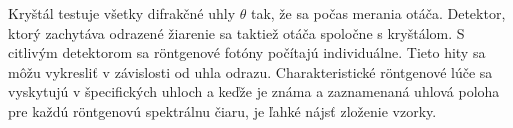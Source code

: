 \documentclass[../../main.tex]{subfiles}
\begin{document}
Kryštál testuje všetky difrakčné uhly $\theta$ tak, že sa počas merania otáča. Detektor, ktorý zachytáva odrazené žiarenie sa taktiež otáča spoločne s kryštálom. S citlivým detektorom sa röntgenové fotóny počítajú individuálne. Tieto hity sa môžu vykresliť v závislosti od uhla odrazu. Charakteristické röntgenové lúče sa vyskytujú v špecifických uhloch a keďže je známa a zaznamenaná uhlová poloha pre každú röntgenovú spektrálnu čiaru, je ľahké nájsť zloženie vzorky.
\end{document}
